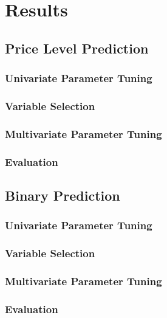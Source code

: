 \section{Results}
\subsection{Price Level Prediction}
\subsubsection{Univariate Parameter Tuning}

\subsubsection{Variable Selection}

\subsubsection{Multivariate Parameter Tuning}

\subsubsection{Evaluation}

\subsection{Binary Prediction}
\subsubsection{Univariate Parameter Tuning}

\subsubsection{Variable Selection}

\subsubsection{Multivariate Parameter Tuning}

\subsubsection{Evaluation}

